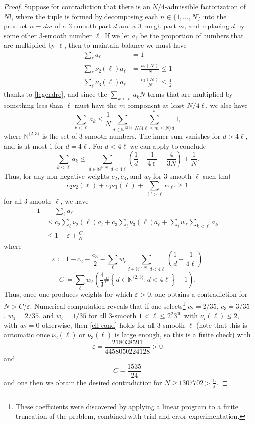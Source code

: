 \documentclass[12pt,a4paper,reqno]{amsart}
\numberwithin{equation}{section}
\theoremstyle{plain}
\theoremstyle{definition}
\newcommand\N{\mathbb{N}}
\newcommand\eps{\varepsilon}
\begin{document}
\begin{proof} Suppose for contradiction that there is an $N/4$-admissible factorization of $N!$, where the tuple is formed by decomposing each $n \in \{1,\dots,N\}$ into the product $n=dm$ of a $3$-smooth part $d$ and a $3$-rough part $m$, and replacing $d$ by some other $3$-smooth number $\ell$.  If we let $a_\ell$ be the proportion of numbers that are multiplied by $\ell$, then to maintain balance we must have
  \begin{align*}
    \sum_\ell a_\ell &= 1 \\
    \sum_\ell \nu_2(\ell) a_\ell &= \frac{\nu_2(N!)}{N} \leq 1 \\
    \sum_\ell \nu_3(\ell) a_\ell &= \frac{\nu_3(N!)}{N} \leq \frac{1}{2}
  \end{align*}
  thanks to \eqref{legendre}, and since the $\sum_{k < \ell} a_k N$ terms that are multiplied by something less than $\ell$ must have the $m$ component at least $N/4\ell$, we also have
  $$ \sum_{k < \ell} a_k \leq \frac{1}{N} \sum_{d \in \N^{\langle 2,3 \rangle}} \sum^*_{N/4\ell \leq m \leq N/d} 1,$$
  where $\N^{\langle 2,3 \rangle}$ is the set of $3$-smooth numbers.
  The inner sum vanishes for $d > 4\ell$, and is at most $1$ for $d = 4\ell$.  For $d < 4\ell$ we can apply  to conclude
  $$ \sum_{k < \ell} a_k \leq \sum_{d \in \N^{\langle 2,3 \rangle}: d < 4\ell} (\frac{1}{d}-\frac{1}{4\ell} + \frac{4}{3N}) + \frac{1}{N}.$$ 
  Thus, for any non-negative weights $c_2, c_3$, and $w_\ell$ for $3$-smooth $\ell$ such that
  \begin{equation}\label{ell-cond}
     c_2 \nu_2(\ell) + c_3 \nu_3(\ell) + \sum_{\ell' > \ell} w_{\ell'} \geq 1
  \end{equation}
  for all $3$-smooth $\ell$, we have
  \begin{align*}
    1 &= \sum_\ell a_\ell \\
    &\leq c_2 \sum_\ell \nu_2(\ell) a_\ell + c_3 \sum_\ell \nu_3(\ell) a_\ell + \sum_{\ell} w_\ell \sum_{k < \ell} a_k\\
    &\leq 1 - \eps  + \frac{C}{N}
  \end{align*}
  where
  $$ \eps \coloneqq 1 -  
c_2 - \frac{c_3}{2} - \sum_{\ell} w_\ell \sum_{d \in \N^{\langle 2,3 \rangle}: d < 4\ell} \left( \frac{1}{d} - \frac{1}{4\ell} \right)$$
  $$ C \coloneqq \sum_\ell w_\ell (\frac{4}{3} \# \left\{ d \in \N^{\langle 2,3 \rangle}: d < 4\ell \right\} + 1).$$
 Thus, once one produces weights for which $\eps>0$, one obtains a contradiction for $N > C/\eps$.
  Numerical computation reveals that if one selects\footnote{These coefficients were discovered by applying a linear program to a finite truncation of the problem, combined with trial-and-error experimentation.} $c_2 = 2/35$, $c_3 = 3/35$, $w_1 = 2/35$, and $w_\ell = 1/35$ for all $3$-smooth $1 < \ell \leq 2^2 3^{10}$ with $\nu_2(\ell) \leq 2$, with $w_\ell=0$ otherwise, then  \eqref{ell-cond} holds for all $3$-smooth $\ell$ (note that this is automatic once $\nu_2(\ell)$ or $\nu_3(\ell)$ is large enough, so this is a finite check) with
$$\eps = \frac{218038591}{4458050224128} > 0$$
and
$$ C = \frac{1535}{24}$$
and one then we obtain the desired contradiction for $N \geq 1307702 > \frac{C}{\eps}$.


\end{proof}
\end{document}
